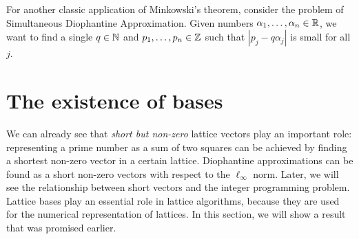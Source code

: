 For another classic application of Minkowski's theorem,
consider the problem of Simultaneous Diophantine Approximation.
Given numbers $\alpha_1, \ldots, \alpha_n \in \mathbb{R}$,
we want to find a single $q \in \mathbb{N}$ and $p_1,\ldots, p_n \in \mathbb{Z}$
such that $|p_j - q\alpha_j|$ is small for all $j$.




\section{The existence of bases}
\label{sec:bases}

We can already see that \emph{short but non-zero} lattice vectors play an important role:
representing a prime number as a sum of two squares can be achieved by finding a shortest non-zero vector in a certain lattice.
Diophantine approximations can be found as a short non-zero vectors with respect to the $\ell_\infty$ norm.
Later, we will see the relationship between short vectors and the integer programming problem.
Lattice bases play an essential role in lattice algorithms, because they are used for the numerical representation of lattices.
In this section, we will show a result that was promised earlier.

